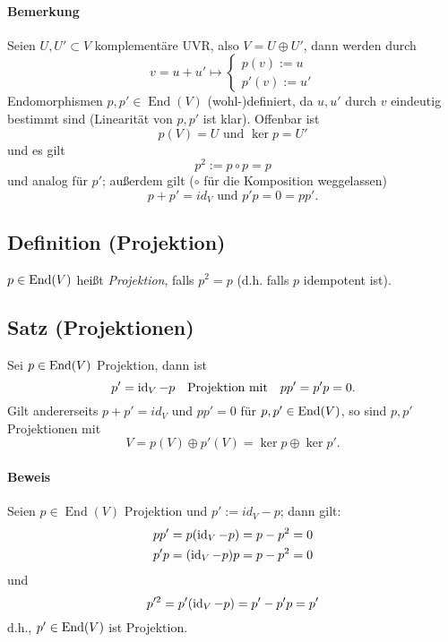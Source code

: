  	\paragraph{Bemerkung}
 		Seien $ U,U'\subset V $ komplementäre UVR, also $ V = U \oplus U' $, dann werden durch
 		\begin{equation*}
 			v = u+u' \mapsto
 			\begin{cases}
 				p(v):=u    \\
 				p'(v):= u'
 			\end{cases}
 		\end{equation*}
 		Endomorphismen $ p,p'\in \operatorname{End}(V) $ (wohl-)definiert, da $ u,u' $ durch $ v $ eindeutig bestimmt sind (Linearität von $ p,p' $ ist klar).
 		Offenbar ist
 		\[
 			p(V) = U \text{ und } \ker p = U'
 		\]
 		und es gilt
 		\[
 			p^2 := p\circ p = p
 		\]
 		und analog für $ p' $; außerdem gilt ($ \circ $ für die Komposition weggelassen)
 		\[
 			p+p' = id_V \text{ und } p'p = 0 = pp'.
 		\]

 \subsection{Definition (Projektion)}
 	\begin{Definition}[Projektion]
 		$ p\in \operatorname{End}(V) $ heißt \emph{Projektion}, falls $ p^2 = p $ (d.h. falls $ p $ idempotent ist).
 	\end{Definition}

 \subsection{Satz (Projektionen)}
 	\begin{Satz}[Projektionen]
 		Sei $ p\in \operatorname{End}(V) $ Projektion, dann ist
 		\[
 			p'= \operatorname{id}_V-p \quad\text{Projektion mit}\quad  pp' = p'p = 0.
 		\]
 		Gilt andererseits $ p+p' = id_V $ und $ pp' = 0 $ für $ p,p' \in \operatorname{End}(V) $, so sind $ p,p' $ Projektionen mit
 		\[
 			V = p(V)\oplus p'(V) = \ker p \oplus \ker p'.
 		\]
 	\end{Satz}

 	\paragraph{Beweis}
 		Seien $p\in \operatorname{End}(V)$ Projektion und $p' := id_V -p$; dann gilt:
 		\begin{align*}
 			pp' & = p(\operatorname{id}_V-p)=p-p^{2} = 0     \\
 			p'p & = (\operatorname{id}_V-p)p = p - p^{2} = 0
 		\end{align*}
 		und
 		\[
 			p'^2 = p'(\operatorname{id}_V-p)=p'-p'p = p'
 		\]
 		d.h., $p'\in\operatorname{End}(V)$ ist Projektion.

